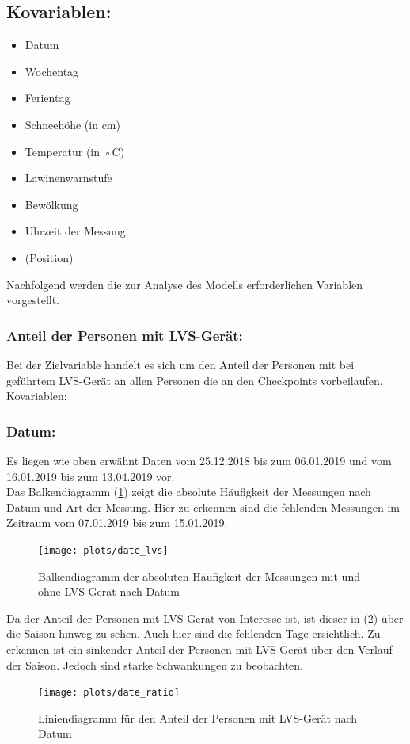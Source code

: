 \documentclass[12pt]{scrreprt}
\begin{document}
\subsection*{Kovariablen:}
\begin{itemize}
	\item Datum
	\item Wochentag
	\item Ferientag
	\item Schneehöhe (in cm)
	\item Temperatur (in ◦C)
	\item Lawinenwarnstufe
	\item Bewölkung
	\item Uhrzeit der Messung
	\item (Position)
\end{itemize}
Nachfolgend werden die zur Analyse des Modells erforderlichen Variablen vorgestellt.

\newpage
\subsubsection*{Anteil der Personen mit LVS-Gerät:}
Bei der Zielvariable handelt es sich um den Anteil der Personen mit bei geführtem LVS-Gerät an allen Personen die an den Checkpoints vorbeilaufen.
Kovariablen:
\subsubsection*{Datum:}
Es liegen wie oben erwähnt Daten vom 25.12.2018 bis zum 06.01.2019 und vom 16.01.2019 bis zum 13.04.2019 vor. \\
Das Balkendiagramm (\ref{pic:date_lvs}) zeigt die absolute Häufigkeit der Messungen nach Datum und Art der Messung. Hier zu erkennen sind die fehlenden Messungen im Zeitraum vom 07.01.2019 bis zum 15.01.2019.
\begin{figure}[H]
	\centering
	\texttt{[image: plots/date\_lvs]}
	\caption{Balkendiagramm der absoluten Häufigkeit der Messungen mit und ohne LVS-Gerät nach Datum}
	\label{pic:date_lvs}	
\end{figure}

\newpage
\noindent Da der Anteil der Personen mit LVS-Gerät von Interesse ist, ist dieser in (\ref{pic:date_ratio}) über die Saison hinweg zu sehen. Auch hier sind die fehlenden Tage ersichtlich. Zu erkennen ist ein sinkender Anteil der Personen mit LVS-Gerät über den Verlauf der Saison. Jedoch sind starke Schwankungen zu beobachten.
\begin{figure}[H]
	\centering
	\texttt{[image: plots/date\_ratio]}
	\caption{Liniendiagramm für den Anteil der Personen mit LVS-Gerät nach Datum}
	\label{pic:date_ratio}	
\end{figure}
\end{document}
